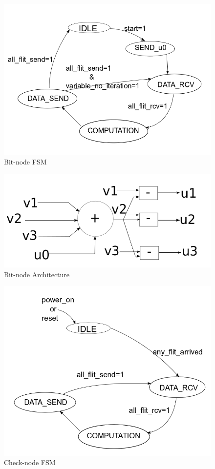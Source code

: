 \begin{figure} [H]
  \centering
   \includegraphics[scale=0.4]{./figs/bit_node_fsm}
  \caption{Bit-node FSM}
  \label{bit_node_fsm}
\end{figure}
  
\begin{figure} [H]
  \centering
   \includegraphics[scale=0.4]{./figs/bit_node}
  \caption{Bit-node Architecture}
  \label{bit_node_architecture}
\end{figure}

 \begin{figure} [H]
  \centering
  \includegraphics[scale=0.4]{./figs/check_node_fsm}
  \caption{Check-node FSM}
  \label{check_node_fsm}
\end{figure}
 
